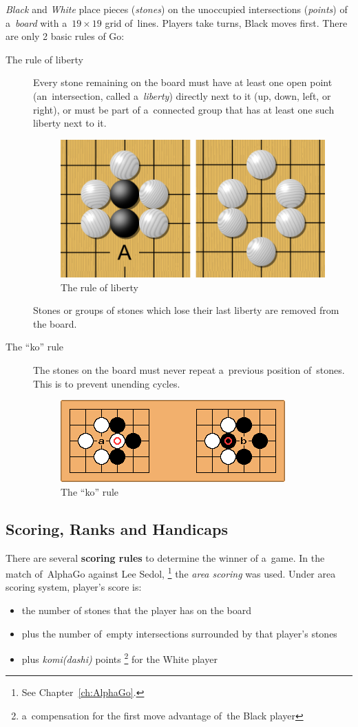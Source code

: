 \emph{Black} and \emph{White} place pieces (\emph{stones}) on the unoccupied intersections (\emph{points}) of a~\emph{board} with a~$19\times19$ grid of~lines.
Players take turns, Black moves first.
There are only 2 basic rules of Go:
\begin{description}
  \item [The rule of liberty]
    Every stone remaining on the board must have at least one open point (an~intersection, called a~\emph{liberty}) directly next to it (up, down, left, or right), or must be part of a~connected group that has at least one such liberty next to it.
    \begin{figure}[H]
      \centering
      \includegraphics[width=.5\textwidth]{../img/Go_rule_of_liberty.png}
      \caption{The rule of liberty}
      \label{fig:Go-rule-liberty}
    \end{figure}

    Stones or groups of stones which lose their last liberty are removed from the board.

  \item [The ``ko'' rule]
    The stones on the board must never repeat a~previous position of~stones.
    This is to prevent unending cycles.
    \begin{figure}[H]
      \centering
      \includegraphics[width=.5\textwidth]{../img/Go_ko_rule.png}
      \caption{The ``ko'' rule}
      \label{fig:Go-Ko-rule}
    \end{figure}

\end{description}

\subsection{Scoring, Ranks and Handicaps}

There are several \textbf{scoring rules} to determine the winner of a~game.
In the match of~AlphaGo against Lee Sedol,%
\footnote{See Chapter~\ref{ch:AlphaGo}.}
the \emph{area scoring} was used.
Under area scoring system, player's score is:
\begin{itemize}
  \item the number of stones that the player has on the board
  \item plus the number of~empty intersections surrounded by that player's stones
  \item plus \emph{komi(dashi)} points%
    \footnote{a~compensation for the first move advantage of~the Black player}
    for the White player
\end{itemize}

